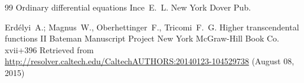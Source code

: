 \begin{thebibliography}{99}
\book Ordinary differential equations
\by Ince~E.~L.
\publaddr New York
\publ Dover Pub.

\by Erd\'elyi~A.; Magnus~W., Oberhettinger~F., Tricomi~F.~G.
\book Higher transcendental functions
\bookvol II
\serial Bateman Manuscript Project
\publaddr New York
\publ McGraw-Hill Book Co.
\totalpages  xvii+396 
\elink Retrieved from  \url{http://resolver.caltech.edu/CaltechAUTHORS:20140123-104529738} (August 08, 2015)

\end{thebibliography}

\EngDate

\newpage
\Russian

%